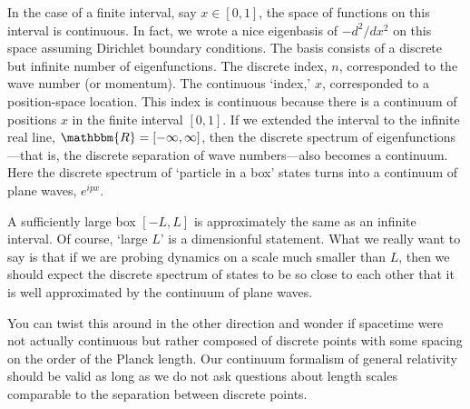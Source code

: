 \documentclass[12pt, oneside]{report}    %
\begin{document}

\begin{example}
In the case of a finite interval, say $x\in [0,1]$, the space of functions on this interval is continuous. In fact, we wrote a nice eigenbasis of $-d^2/dx^2$ on this space assuming Dirichlet boundary conditions. The basis consists of a discrete but infinite number of eigenfunctions. The discrete index, $n$, corresponded to the wave number (or momentum). The continuous `index,' $x$, corresponded to a position-space location. This index is continuous because there is a continuum of positions $x$ in the finite interval $[0,1]$. If we extended the interval to the infinite real line, $\mathbbm{R} = [-\infty, \infty]$, then the discrete spectrum of eigenfunctions---that is, the discrete separation of wave numbers---also becomes a continuum. Here the discrete spectrum of `particle in a box' states turns into a continuum of plane waves, $e^{ipx}$. 

A sufficiently large box $[-L,L]$ is approximately the same as an infinite interval. Of course, `large $L$' is a dimensionful statement. What we really want to say is that if we are probing dynamics on a scale much smaller than $L$, then we should expect the discrete spectrum of states to be so close to each other that it is well approximated by the continuum of plane waves. 

You can twist this around in the other direction and wonder if spacetime were not actually continuous but rather composed of discrete points with some spacing on the order of the Planck length. Our continuum formalism of general relativity should be valid as long as we do not ask questions about length scales comparable to the separation between discrete points. 
\end{example}

\end{document}
